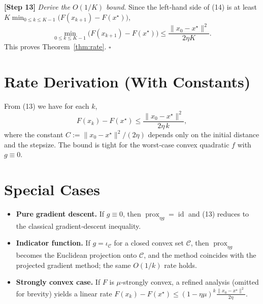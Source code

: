 \documentclass{article}
\newcommand{\prox}{\operatorname{prox}}
\begin{document}
\noindent\textbf{[Step 13]}  \textit{Derive the $O(1/K)$ bound}.  
Since the left‑hand side of (14) is at least $K\min_{0\le k\le K-1}\bigl(F(x_{k+1})-F(x^{\star})\bigr)$,
\[
\min_{0\le k\le K-1}\bigl(F(x_{k+1})-F(x^{\star})\bigr)
\le \frac{\|x_{0}-x^{\star}\|^{2}}{2\eta K}.
\tag{15}
\]
This proves Theorem~\ref{thm:rate}. $\square$

\section*{Rate Derivation (With Constants)}
From (13) we have for each $k$,
\[
F(x_{k})-F(x^{\star})\le \frac{\|x_{0}-x^{\star}\|^{2}}{2\eta\,k},
\]
where the constant $C:=\|x_{0}-x^{\star}\|^{2}/(2\eta)$ depends only on the initial distance and the stepsize. The bound is tight for the worst‑case convex quadratic $f$ with $g\equiv0$.

\section*{Special Cases}
\begin{itemize}
    \item \textbf{Pure gradient descent.} If $g\equiv0$, then $\prox_{\eta g}=\operatorname{id}$ and (13) reduces to the classical gradient‑descent inequality.
    \item \textbf{Indicator function.} If $g=\iota_{\mathcal{C}}$ for a closed convex set $\mathcal{C}$, then $\prox_{\eta g}$ becomes the Euclidean projection onto $\mathcal{C}$, and the method coincides with the projected gradient method; the same $O(1/k)$ rate holds.
    \item \textbf{Strongly convex case.} If $F$ is $\mu$‑strongly convex, a refined analysis (omitted for brevity) yields a linear rate $F(x_{k})-F(x^{\star})\le (1-\eta\mu)^{k}\frac{\|x_{0}-x^{\star}\|^{2}}{2\eta}$.
\end{itemize}
\end{document}
